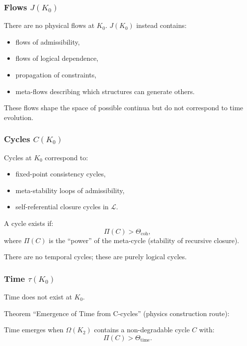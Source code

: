 \subsubsection{Flows \texorpdfstring{$J(K_0)$}{J(K_0)}}

There are no physical flows at $K_0$.
$J(K_0)$ instead contains:
\begin{itemize}
    \item flows of admissibility,
    \item flows of logical dependence,
    \item propagation of constraints,
    \item meta-flows describing which structures can generate others.
\end{itemize}

These flows shape the space of possible continua but do not correspond
to time evolution.

\subsubsection{Cycles \texorpdfstring{$C(K_0)$}{C(K_0)}}

Cycles at $K_0$ correspond to:
\begin{itemize}
    \item fixed-point consistency cycles,
    \item meta-stability loops of admissibility,
    \item self-referential closure cycles in $\mathcal{L}$.
\end{itemize}

A cycle exists if:
\[
\Pi(C) > \Theta_{\mathrm{coh}},
\]
where $\Pi(C)$ is the ``power'' of the meta-cycle (stability of recursive
closure).

There are no temporal cycles; these are purely logical cycles.

\subsubsection{Time \texorpdfstring{$\tau(K_0)$}{\tau(K_0)}}

Time does not exist at $K_0$.

Theorem “Emergence of Time from C-cycles” (physics construction route):

Time emerges when $\Omega(K_2)$ contains a non-degradable cycle
$C$ with:
\[
\Pi(C) > \Theta_{\mathrm{time}}.
\]

